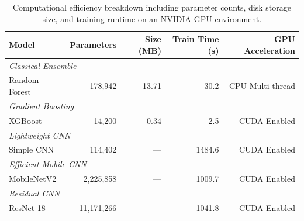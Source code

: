 \begin{table}[ht]
  \centering
  \caption{Computational efficiency breakdown including parameter counts, disk storage size, and training runtime on an NVIDIA GPU environment.}
  \label{tab:efficiency}
  \begin{tabular}{lrrrr}
    \toprule
    \textbf{Model} & \textbf{Parameters} & \textbf{Size (MB)} & \textbf{Train Time (s)} & \textbf{GPU Acceleration} \\
    \midrule
    \multicolumn{5}{l}{\textit{Classical Ensemble}} \\
    Random Forest & 178,942 & 13.71 & 30.2 & CPU Multi-thread \\
    \midrule
    \multicolumn{5}{l}{\textit{Gradient Boosting}} \\
    XGBoost & 14,200 & 0.34 & 2.5 & CUDA Enabled \\
    \midrule
    \multicolumn{5}{l}{\textit{Lightweight CNN}} \\
    Simple CNN & 114,402 & --- & 1484.6 & CUDA Enabled \\
    \midrule
    \multicolumn{5}{l}{\textit{Efficient Mobile CNN}} \\
    MobileNetV2 & 2,225,858 & --- & 1009.7 & CUDA Enabled \\
    \midrule
    \multicolumn{5}{l}{\textit{Residual CNN}} \\
    ResNet-18 & 11,171,266 & --- & 1041.8 & CUDA Enabled \\
    \bottomrule
  \end{tabular}
\end{table}
